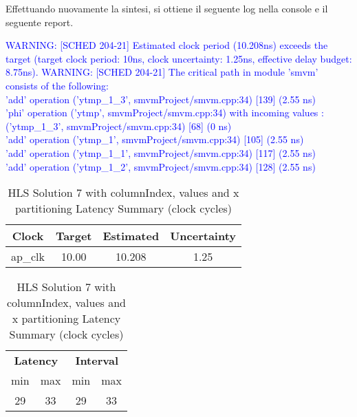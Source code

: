

Effettuando nuovamente la sintesi, si ottiene il seguente log nella console e il seguente report.

\textcolor{blue}{WARNING: [SCHED 204-21] Estimated clock period (10.208ns) exceeds the target (target clock period: 10ns, clock uncertainty: 1.25ns, effective delay budget: 8.75ns).}
\textcolor{blue}{WARNING: [SCHED 204-21] The critical path in module 'smvm' consists of the following:}
\\
\textcolor{blue}{'add' operation ('ytmp\_1\_3', smvmProject/smvm.cpp:34) [139]  (2.55 ns)}
\\
\textcolor{blue}{'phi' operation ('ytmp', smvmProject/smvm.cpp:34) with incoming values : ('ytmp\_1\_3', smvmProject/smvm.cpp:34) [68]  (0 ns)}
\\
\textcolor{blue}{'add' operation ('ytmp\_1', smvmProject/smvm.cpp:34) [105]  (2.55 ns)}
\\
\textcolor{blue}{'add' operation ('ytmp\_1\_1', smvmProject/smvm.cpp:34) [117]  (2.55 ns)}
\\
\textcolor{blue}{'add' operation ('ytmp\_1\_2', smvmProject/smvm.cpp:34) [128]  (2.55 ns)}

\begin{table}[H]
	\centering
	\begin{minipage}[t]{0.45\linewidth}
		\centering
		\begin{tabular}{|c|c|c|c|}
			\hline
			\textbf{Clock} & \textbf{Target} & \textbf{Estimated} & \textbf{Uncertainty} \\
			\hline
			ap\_clk & 10.00 & 10.208 & 1.25 \\
			\hline
		\end{tabular}
		\caption{HLS Solution 7 with columnIndex, values and x partitioning Timing Summary (ns)}
		\label{tab:hls-solution-7-columnindex-values-x-partitioning-timing-summary}
	\end{minipage}
	\hfill
	\begin{minipage}[t]{0.45\linewidth}
		\centering
		\begin{tabular}{|c|c|c|c|}
			\hline
			\multicolumn{2}{|c|}{\textbf{Latency}} & \multicolumn{2}{|c|}{\textbf{Interval}} \\
			min & max & min & max \\
			\hline
			29 & 33 & 29 & 33 \\
			\hline
		\end{tabular}
		\caption{HLS Solution 7 with columnIndex, values and x partitioning Latency Summary (clock cycles)}
		\label{tab:hls-solution-7-columnindex-values-x-partitioning-latency-summary}
	\end{minipage}
\end{table}

